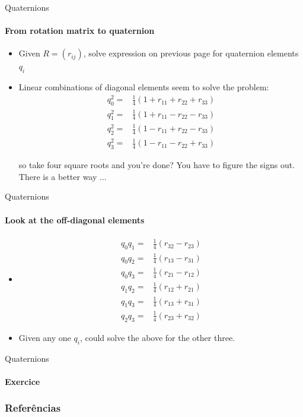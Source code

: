 \documentclass[aspectratio=169]{beamer}
\begin{document}
\begin{frame}{Quaternions}
    \framesubtitle{From rotation matrix to quaternion}

    \begin{itemize}
        \item Given $R = (r_{ij})$, solve expression on previous page for
        quaternion elements $q_i$ 
        \item Linear combinations of diagonal elements seem to solve the problem:
        \begin{align*}
                q_0^2 =& \frac{1}{4} (1 + r_{11} + r_{22} + r_{33}) \\
                q_1^2 =& \frac{1}{4} (1 + r_{11} - r_{22} - r_{33}) \\
                q_2^2 =& \frac{1}{4} (1 - r_{11} + r_{22} - r_{33}) \\
                q_3^2 =& \frac{1}{4} (1 - r_{11} - r_{22} + r_{33})   
        \end{align*}
        
        so take four square roots and you're done?  You have to figure the
        signs out.  There is a better way $\ldots$
    \end{itemize}

\end{frame}

\begin{frame}{Quaternions}
    \framesubtitle{Look at the off-diagonal elements}
\begin{itemize}
    \item[]
    \begin{align*}
            q_0 q_1 =& \frac{1}{4}(r_{32} - r_{23}) \\
            q_0 q_2 =& \frac{1}{4}(r_{13} - r_{31}) \\
            q_0 q_3 =& \frac{1}{4}(r_{21} - r_{12}) \\
            q_1 q_2 =& \frac{1}{4}(r_{12} + r_{21}) \\
            q_1 q_3 =& \frac{1}{4}(r_{13} + r_{31}) \\
            q_2 q_3 =& \frac{1}{4}(r_{23} + r_{32})
    \end{align*}
    
    \item[]  Given any one $q_i$, could solve the above for the other three.
    \end{itemize}
\end{frame}



\begin{frame}{Quaternions}
    \framesubtitle{Exercice}

\end{frame}


\begin{frame}[t, allowframebreaks]
	\frametitle{Referências}
	
\end{frame}
\end{document}
